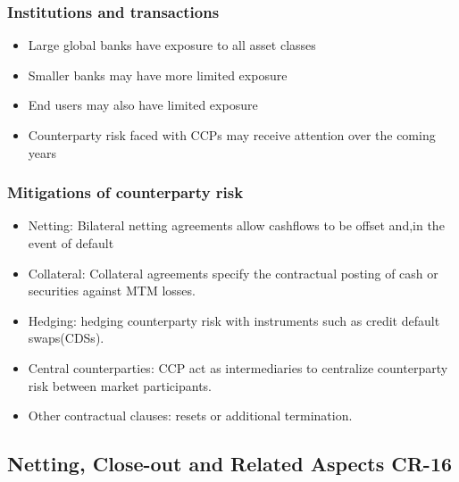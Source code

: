 \subsubsection{Institutions and transactions}
\begin{itemize}
    \item Large global banks have exposure to all asset classes
    \item Smaller banks may have more limited exposure
    \item End users may also have limited exposure
    \item Counterparty risk faced with CCPs may receive attention over the coming years
\end{itemize}



\subsubsection{Mitigations of counterparty risk}
\begin{itemize}
    \item Netting: Bilateral netting agreements allow cashflows to be offset and,in the event of default
    \item Collateral: Collateral agreements specify the contractual posting of cash or securities against MTM losses.
    \item Hedging: hedging counterparty risk with instruments such as credit default swaps(CDSs).
    \item Central counterparties: CCP act as intermediaries to centralize counterparty risk between market participants.
    \item Other contractual clauses: resets or additional termination.
\end{itemize}


\subsection{Netting, Close-out and Related Aspects CR-16}

